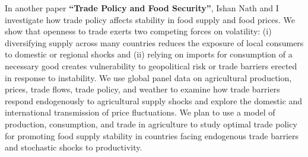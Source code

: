 \documentclass{jmstatement}
\begin{document}
In another paper \textbf{``Trade Policy and Food Security''}, Ishan Nath and I
investigate how trade policy affects stability in
food supply and food prices. We show that openness to trade exerts two
competing forces on volatility: (i) diversifying supply across many
countries reduces the exposure of local consumers to domestic or
regional shocks and (ii) relying on imports for consumption of a
necessary good creates vulnerability to geopolitical risk or trade
barriers erected in response to instability. We use global panel data on
agricultural production, prices, trade flows, trade policy, and weather
to examine how trade barriers respond endogenously to agricultural
supply shocks and explore the domestic and international transmission of
price fluctuations. We plan to use a model of production, consumption,
and trade in agriculture to study optimal trade policy for promoting
food supply stability in countries facing endogenous trade barriers and
stochastic shocks to productivity.


\begingroup
\renewcommand{\section}[2]{}%


\endgroup
\end{document}
